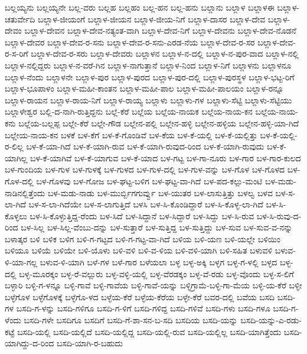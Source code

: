 ಬಲ್ಲಯ್ಯನು
ಬಲ್ಲಯ್ಯನೇ
ಬಲ್ಲ-ವರು
ಬಲ್ಲಹ
ಬಲ್ಲಹಂ
ಬಲ್ಲ-ಹನ
ಬಲ್ಲ-ಹನು
ಬಲ್ಲಾನು
ಬಲ್ಲಾಳ
ಬಲ್ಲಾಳಈ
ಬಲ್ಲಾಳ-ಚತುರ್ವೇದಿ
ಬಲ್ಲಾಳ-ಜೀಯಂಗೆ
ಬಲ್ಲಾಳ-ಜೀಯನ
ಬಲ್ಲಾಳ-ಜೀಯ-ನಿಗೆ
ಬಲ್ಲಾಳ-ದಾಸರ
ಬಲ್ಲಾಳ-ದೇವ
ಬಲ್ಲಾಳ-ದೇವಂ
ಬಲ್ಲಾಳ-ದೇವನ
ಬಲ್ಲಾಳ-ದೇವ-ನತ್ಯಂತ-ವಾಗಿ
ಬಲ್ಲಾಳ-ದೇವ-ನಿಗೆ
ಬಲ್ಲಾಳ-ದೇವನು
ಬಲ್ಲಾಳ-ದೇವ-ನೊಡನೆ
ಬಲ್ಲಾಳ-ದೇವರ
ಬಲ್ಲಾಳ-ದೇವ-ರ-ಸನು
ಬಲ್ಲಾಳ-ದೇವ-ರ-ಸನು-ಎರಡ-ನೆಯ
ಬಲ್ಲಾಳ-ದೇವ-ರ-ಸರ
ಬಲ್ಲಾಳ-ದೇವ-ರ-ಸ-ರಿಗೆ
ಬಲ್ಲಾಳ-ದೇವ-ರ-ಸರು
ಬಲ್ಲಾಳ-ದೇವರು
ಬಲ್ಲಾಳನ
ಬಲ್ಲಾಳ-ನ-ದಲ್ಲಿ
ಬಲ್ಲಾಳ-ನ-ಪುರ-ವಾದ
ಬಲ್ಲಾಳ-ನಲ್ಲಿ
ಬಲ್ಲಾಳ-ನಲ್ಲಿದ್ದರು
ಬಲ್ಲಾಳ-ನ-ವರೆ-ಗಿನ
ಬಲ್ಲಾಳ-ನಾಗುತ್ತಾನೆ
ಬಲ್ಲಾಳ-ನಿಂದ
ಬಲ್ಲಾಳ-ನಿಗೆ
ಬಲ್ಲಾಳನು
ಬಲ್ಲಾಳನೂ
ಬಲ್ಲಾಳ-ನೆಂದು
ಬಲ್ಲಾಳನೇ
ಬಲ್ಲಾಳ-ಪುರ
ಬಲ್ಲಾಳ-ಪುರದ
ಬಲ್ಲಾಳ-ಪುರ-ದಲ್ಲಿ
ಬಲ್ಲಾಳ-ಪುರಸ್ಥಳ
ಬಲ್ಲಾಳ-ಭಟ್ಟ-ರಿಗೆ
ಬಲ್ಲಾಳ-ಭೂಪಾಳಂ
ಬಲ್ಲಾಳ-ಮಹೀ-ಕಾಂತನ
ಬಲ್ಲಾಳ-ಮಹೀ-ಪಾಲ
ಬಲ್ಲಾಳ-ಮಹೀ-ಪಾಲಯಂ
ಬಲ್ಲಾಳ-ರನ್ನೂ
ಬಲ್ಲಾಳ-ರಾಯನ
ಬಲ್ಲಾಳ-ರಾಯ-ನಿಗೆ
ಬಲ್ಲಾಳ-ರಾಯ್ಯ
ಬಲ್ಲಾಳು
ಬಲ್ಲಾಳು-ಗಳ
ಬಲ್ಲಾಳು-ಸೆಟ್ಟಿ
ಬಲ್ಲಾಳು-ಸೆಟ್ಟಿಯು
ಬಲ್ಲಾಳೇಶ್ವರ
ಬಲ್ಲಿ-ದ-ನಾಗಿ-ರುತ್ತಿದ್ದನು
ಬಲ್ಲೆ-ಕೆರೆ
ಬಲ್ಲೆಯ
ಬಲ್ಲೆಯ-ನಾಯಕ
ಬಲ್ಲೆಯ-ನಾಯ-ಕನ
ಬಲ್ಲೆಯ-ನಾಯ-ಕನು
ಬಲ್ಲೆಯ-ಬಲ್ಲಪ್ಪ
ಬಲ್ಲೇ-ಕೆರೆ
ಬಲ್ಲೇ-ಗೌಡ
ಬಲ್ಲೇನ-ಪಲ್ಲಿ
ಬಲ್ಲೇನ-ಹಳ್ಳಿ
ಬಲ್ಲೇನ-ಹಳ್ಳಿಯ
ಬಲ್ಲೇನ-ಹಳ್ಳಿ-ಯಾ-ಗಿದೆ
ಬಲ್ಲೇಯ-ನಾಯ-ಕನ
ಬಳಕೆ
ಬಳ-ಕೆಗೆ
ಬಳ-ಕೆ-ಗೊಂಡಿವೆ
ಬಳ-ಕೆಯ
ಬಳ-ಕೆ-ಯಲ್ಲಿ
ಬಳ-ಕೆ-ಯಲ್ಲಿತ್ತು
ಬಳ-ಕೆ-ಯಲ್ಲಿ-ರ-ಲಿಲ್ಲ
ಬಳ-ಕೆ-ಯಾ-ಗಿದೆ
ಬಳ-ಕೆ-ಯಾಗಿ-ರುವ
ಬಳ-ಕೆ-ಯಾಗಿ-ರುವುದ-ರಿಂದ
ಬಳ-ಕೆ-ಯಾಗಿ-ರುವುದು
ಬಳ-ಕೆ-ಯಾಗಿಲ್ಲ
ಬಳ-ಕೆ-ಯಾಗಿವೆ
ಬಳ-ಕೆ-ಯಾಗುವ
ಬಳ-ಕೆ-ಯಾದ
ಬಳ-ಗಟ್ಟ
ಬಳ-ಗಾ-ನೂರು
ಬಳ-ಗಾರ
ಬಳ-ಗಾರ-ಕುಲದ
ಬಳ-ಗುಂದಿಯ
ಬಳ-ಗುಳ
ಬಳ-ಗುಳಕ್ಕೆ
ಬಳ-ಗುಳದ
ಬಳ-ಗುಳ-ದಲ್ಲಿ
ಬಳ-ಗುಳ-ವನ್ನು
ಬಳ-ಗೊಳ
ಬಳ-ಗೊಳದ
ಬಳ-ಗೊಳ-ದಲ್ಲಿ
ಬಳ-ಗೊಳವು
ಬಳ-ಗೋಜ
ಬಳ-ಘಟ್ಟ-ಬಳಿಗ
ಬಳ-ಘಟ್ಟ-ವಾ-ಗಿದೆ
ಬಳ-ಪದ-ಕಲ್ಲು-ಮಂಟಿ
ಬಳ-ಮಡು-ನಾಡಿನಲ್ಲಿತ್ತೆಂದು
ಬಳ-ಮಡು-ನಾಡು
ಬಳ-ಮುರ್ಬ್ಬಿಗಗುರ್ವ್ವು
ಬಳ-ಯುತರ
ಬಳ-ಲಾಸುತ್ತಿತ್ತು
ಬಳಲ್ವ
ಬಳವ
ಬಳ-ಸ-ಲಾ-ಗಿದೆ
ಬಳ-ಸ-ಲಾ-ಗಿದೆಯೇ
ಬಳ-ಸ-ಲಾಗುತ್ತಿದೆ
ಬಳಸಿ
ಬಳ-ಸಿ-ಕೊಂಡಿದ್ದಾರೆ
ಬಳ-ಸಿ-ಕೊಳ್ಳ-ಲಾ-ಗಿದೆ
ಬಳ-ಸಿ-ಕೊಳ್ಳಲು
ಬಳ-ಸಿ-ಕೊಳ್ಳುತ್ತಿದ್ದ-ರೆಂದು
ಬಳ-ಸಿದೆ
ಬಳ-ಸಿದ್ದಾನೆ
ಬಳ-ಸಿದ್ದಾರೆ
ಬಳ-ಸಿದ್ದು
ಬಳ-ಸಿ-ರುವ
ಬಳ-ಸಿ-ರುವು-ದ-ರಿಂದ
ಬಳ-ಸಿಲ್ಲ
ಬಳ-ಸಿಲ್ಲ-ವೆಂಬು-ದನ್ನು
ಬಳ-ಸುತ್ತಾರೆ
ಬಳ-ಸುತ್ತಿದ್ದ
ಬಳ-ಸುತ್ತಿದ್ದು
ಬಳ-ಸುವ
ಬಳ-ಸುವ-ವ-ನನ್ನು
ಬಳಾತ್ಕರ
ಬಳಿ
ಬಳಿಕ
ಬಳಿಗ
ಬಳಿ-ಗ-ಗಟ್ಟದ
ಬಳಿ-ಗ-ಗಟ್ಟ-ವಾ-ಗಿದೆ
ಬಳಿಯ
ಬಳಿ-ಯಣ
ಬಳಿ-ಯಲ್ಲೇ
ಬಳಿಯಿಂ
ಬಳಿಯೂ
ಬಳಿಯೆ
ಬಳಿಯೇ
ಬಳಿ-ಯೊಳು
ಬಳಿ-ವಳಿ
ಬಳಿ-ವ-ಳಿಯ
ಬಳಿ-ವಳಿ-ಯಾಗಿ
ಬಳಿ-ಸಹಿತ
ಬಳುವಳಿ
ಬಳುವ-ಳಿ-ಯಾ-ಗಲ್ಲ
ಬಳುವ-ಳಿ-ಯಾಗಿ
ಬಳೆ-ಗಳ
ಬಳೆ-ಗಾರ
ಬಳೆಯಲಾ
ಬಳ್ಳ
ಬಳ್ಳ-ಅಕ್ಕಿ
ಬಳ್ಳಗ
ಬಳ್ಳ-ಗ-ಳಲ್ಲಿ
ಬಳ್ಳದ
ಬಳ್ಳ-ದಲ್ಲಿ
ಬಳ್ಳ-ಮೂರಕ್ಕಂ
ಬಳ್ಳ-ರೆ-ವಲ್ಲುರು
ಬಳ್ಳ-ವಳ್ಳಿ-ಯಲ್ಲಿ
ಬಳ್ಳ-ವೆರಡಕ್ಕಂ
ಬಳ್ಳ-ವೆ-ರಡು
ಬಳ್ಳ-ವೊಂದು
ಬಳ್ಳ-ಸ-ಲಿಗೆ
ಬಳ್ಳಾರಿ
ಬಳ್ಳಿ-ಗ-ಳನ್ನೂ
ಬಳ್ಳಿ-ಗಾವೆ
ಬಳ್ಳಿ-ಗಾವೆಯ
ಬಳ್ಳಿ-ಗಾವೆ-ಯನ್ನು
ಬಳ್ಳಿಗ್ರಾಮೆ-ಬಳ್ಳಿ-ಗಾ-ಮೆಯ
ಬಳ್ಳಿ-ಯ-ಕೆರೆ
ಬಳ್ಳೀ
ಬಳ್ಳೆಗೊಳ
ಬಳ್ಳೆಗೊಳಕ್ಕೆ
ಬಳ್ಳೆಗೊ-ಳದ
ಬಳ್ಳೆಯ-ಕೆರೆ
ಬಳ್ಳೆಯ-ಕೆರೆಯ
ಬಳ್ಳೇ-ಕೆರೆ
ಬವರ-ದಲ್ಲಿ
ಬವೆಯ
ಬಸದಿ
ಬಸದಿ-ಗಳ
ಬಸದಿ-ಗ-ಳನ್ನು
ಬಸದಿ-ಗಳಿಗೂ
ಬಸದಿ-ಗ-ಳಿಗೆ
ಬಸದಿ-ಗಳಿದ್ದ
ಬಸದಿ-ಗಳಿವೆ
ಬಸದಿ-ಗಳು
ಬಸದಿ-ಗಳೂ
ಬಸದಿ-ಗ-ಳೆಂದು
ಬಸದಿ-ಗಳೇ
ಬಸದಿಗೂ
ಬಸದಿಗೆ
ಬಸದಿ-ಗೆ-ಶಾ-ಸನ-ಬ-ಸದಿ
ಬಸದಿಯ
ಬಸದಿ-ಯನ್ನು
ಬಸದಿ-ಯನ್ನು-ಎ-ರಡು-ಕಟ್ಟೆ
ಬಸದಿ-ಯಲ್ಲಿ
ಬಸದಿ-ಯಲ್ಲಿದೆ
ಬಸದಿ-ಯಲ್ಲಿದ್ದ
ಬಸದಿ-ಯಲ್ಲಿ-ರುವ
ಬಸದಿ-ಯಲ್ಲಿಲ್ಲ
ಬಸದಿ-ಯಾಗಿತ್ತೆಂದು
ಬಸದಿ-ಯಾಗಿದ್ದು-ದ-ರಿಂದ
ಬಸದಿ-ಯಾಗಿ-ರ-ಬಹುದು
